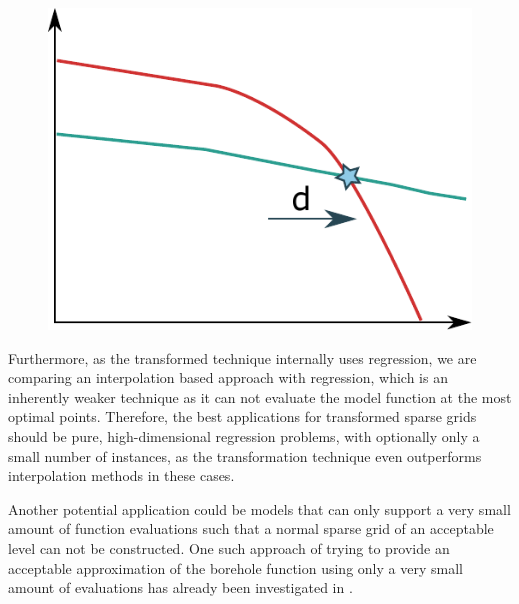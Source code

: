 \documentclass[
  a4paper,  %
  twoside,  %
  bibliography=totoc,
  headsepline,
  cleardoublepage=empty,
  parskip=half,
  draft=false
]{scrbook}
\begin{document}
\begin{mdframed}[style=style]
\begin{figure}[H]
        \centering
\begin{minipage}{0.49\textwidth}
        \centering
{}
\label{fig:trend}
    \end{minipage}%
    \begin{minipage}{0.49\textwidth}
        \centering
   \includegraphics[width=0.7\linewidth]{graphics/trend}
   \vspace{2mm}
    \end{minipage}
\end{figure}
\end{mdframed}
%
Furthermore, as the transformed technique internally uses regression, we are comparing an interpolation based approach with regression, which is an inherently weaker technique as it can not evaluate the model function at the most optimal points.
Therefore, the best applications for transformed sparse grids should be pure, high-dimensional regression problems, with optionally only a small number of instances, as the transformation technique even outperforms interpolation methods in these cases.

Another potential application could be models that can only support a very small amount of function evaluations such that a normal sparse grid of an acceptable level can not be constructed.
One such approach of trying to provide an acceptable approximation of the borehole function using only a very small amount of evaluations has already been investigated in \cite{}.
\end{document}
